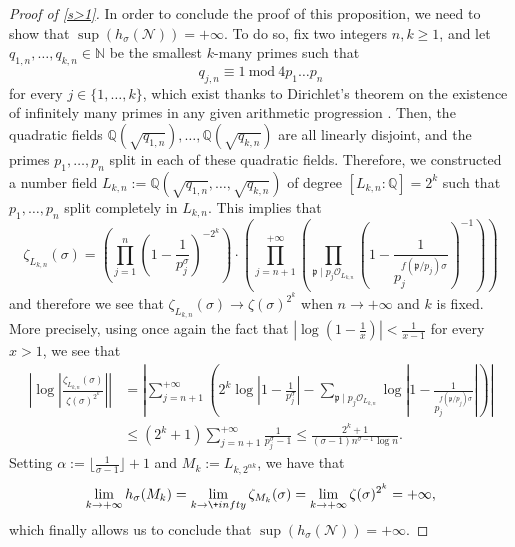 \documentclass[10pt,a4paper]{amsart}
\theoremstyle{plain}
\theoremstyle{definition}
\theoremstyle{remark}
\begin{document}
\begin{proof}[Proof of \cref{s>1}]
        In order to conclude the proof of this proposition, we need to show that $\sup(h_\sigma(\mathcal{N})) = +\infty$. To do so, fix two integers $n,k \geq 1$, and let $q_{1,n},\dots,q_{k,n} \in \mathbb{N}$ be the smallest $k$-many primes such that \[q_{j,n} \equiv 1 \ \text{mod} \ 4 p_1 \dots p_n\] for every $j \in \{1,\dots,k\}$, which exist thanks to Dirichlet's theorem on the existence of infinitely many primes in any given arithmetic progression \cite[Section~2.3]{Iwaniec_Kowalski_2004}. Then, the quadratic fields $\mathbb{Q}(\sqrt{q_{1,n}}),\dots,\mathbb{Q}(\sqrt{q_{k,n}})$ are all linearly disjoint, and the primes $p_1,\dots,p_n$ split in each of these quadratic fields. Therefore, we constructed a number field $L_{k,n} := \mathbb{Q}(\sqrt{q_{1,n}},\dots,\sqrt{q_{k,n}})$ of degree $[L_{k,n} \colon \mathbb{Q}] = 2^k$ such that $p_1,\dots,p_n$ split completely in $L_{k,n}$.
        This implies that
        \[
            \zeta_{L_{k,n}}(\sigma) = \left( \prod_{j=1}^n \left( 1 - \frac{1}{p_j^\sigma} \right)^{-2^k} \right) \cdot \left( \prod_{j= n+1}^{+\infty} \left( \prod_{\mathfrak{p} \mid p_j \mathcal{O}_{L_{k,n}}}  \left( 1 - \frac{1}{p_j^{f(\mathfrak{p}/p_j) \sigma}} \right)^{-1} \right) \right)  
        \]
        and therefore we see that $\zeta_{L_{k,n}}(\sigma) \to \zeta(\sigma)^{2^k}$ when $n \to +\infty$ and $k$ is fixed. More precisely, using once again the fact that $\left\lvert \log\left( 1 - \frac{1}{x} \right) \right\rvert < \frac{1}{x-1}$ for every $x > 1$, we see that
        \[
            \begin{aligned}
                \left\lvert \log\left\lvert \frac{\zeta_{L_{k,n}}(\sigma)}{\zeta(\sigma)^{2^k}} \right\rvert \right\rvert &= \left\lvert \sum_{j=n+1}^{+\infty} \left( 2^k \log\left\lvert 1-\frac{1}{p_j^\sigma} \right\rvert - \sum_{\mathfrak{p} \mid p_j \mathcal{O}_{L_{k,n}}} \log\left\lvert 1 - \frac{1}{p_j^{f(\mathfrak{p}/p_j) \sigma}} \right\rvert \right) \right\rvert \\
                &\leq (2^k+1) \sum_{j=n+1}^{+\infty} \frac{1}{p_j^\sigma - 1} \leq \frac{2^k+1}{(\sigma-1) n^{\sigma-1} \log n}.
            \end{aligned} 
        \]
        Setting $\alpha := \lfloor \frac{1}{\sigma-1} \rfloor + 1$ and $M_k := L_{k,2^{\alpha k}}$, we have that
        \[
            \lim_{k \to +\infty} h_\sigma(M_k) = \lim_{k \to \+infty} \zeta_{M_k}(\sigma) = \lim_{k \to +\infty} \zeta(\sigma)^{2^k} = +\infty,
        \]
        which finally allows us to conclude that $\sup(h_\sigma(\mathcal{N})) = +\infty$.
    \end{proof}
      
\end{document}
